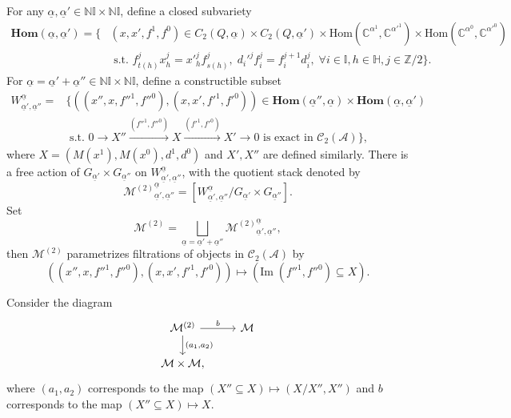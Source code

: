 \documentclass[12pt]{amsart}
\theoremstyle{definition}
\numberwithin{equation}{section}
\begin{document}
For any $ \underline{\alpha},\underline{\alpha}' \in \mathbb{N}\mathbb{I} \times \mathbb{N}\mathbb{I}$, define a closed subvariety
\begin{align*}
    \mathbf{Hom}(\underline{\alpha},\underline{\alpha}') =\{&(x,x',f^1,f^0)  \in C_2(Q,\underline{\alpha}) \times C_2(Q, \underline{\alpha}') \times \mathrm{Hom}(\mathbb{C}^{\alpha^1},\mathbb{C}^{{\alpha}'^{1}}) \times \mathrm{Hom}(\mathbb{C}^{\alpha^0},\mathbb{C}^{{\alpha}'^{0}})\\
    &\text{ s.t. } f_{t(h)}^j x_h^j = {x'}_h^j f_{s(h)}^j, \;d_i'^j f_i^j = f_i^{j+1} d_i^j  ,\; \forall i \in \mathbb{I}, h\in \mathbb{H}, j\in \mathbb{Z}/2\}.
\end{align*} 
For $ \underline{\alpha}=\underline{\alpha}' +\underline{\alpha}'' \in \mathbb{N}\mathbb{I} \times \mathbb{N}\mathbb{I}$, define a constructible subset
\begin{align*}   W_{\underline{\alpha}',\underline{\alpha}''}^{\underline{\alpha}} = &\{((x'',x,f''^1,f''^0), (x,x',f'^1,f'^0)) \in \mathbf{Hom}(\underline{\alpha}'',\underline{\alpha}) \times \mathbf{Hom}(\underline{\alpha},\underline{\alpha}')\\
    &\text{ s.t. } 0 \to X'' \xrightarrow{(f''^1,f''^0)} X \xrightarrow{(f'^1,f'^0)} X' \to 0 \text{ is exact in } \mathcal{C}_2(\mathcal{A})\},
\end{align*}
where $ X= (M(x^1), M(x^0), d^1, d^0)$ and $ X',X'' $ are defined similarly. 
There is a free action of $ G_{\underline{\alpha}'} \times G_{\underline{\alpha}''}$ on $ W_{\underline{\alpha}',\underline{\alpha}''}^{\underline{\alpha}}  $, with the quotient stack denoted by
\[
{\mathcal{M}^{(2)}}_{\underline{\alpha}',\underline{\alpha}''}^{\underline{\alpha}} = [W_{\underline{\alpha}',\underline{\alpha}''}^{\underline{\alpha}}/G_{\underline{\alpha}'} \times G_{\underline{\alpha}''}].
\]
Set
\[
\mathcal{M}^{(2)} =\bigsqcup _{\underline{\alpha}=\underline{\alpha}' +\underline{\alpha}''}{\mathcal{M}^{(2)}}_{\underline{\alpha}',\underline{\alpha}''}^{\underline{\alpha}},
\]
then $ \mathcal{M}^{(2)} $ parametrizes filtrations of objects in $ \mathcal{C}_2(\mathcal{A}) $ by
\[
((x'',x,f''^1,f''^0), (x,x',f'^1,f'^0)) \mapsto (\mathrm{Im}\;(f''^1,f''^0) \subseteq X).
\]

Consider the diagram
\[
\begin{tikzcd}
\mathcal{M}^{(2)} \arrow[r,"b"] \arrow[d,"{(a_1,a_2)}"] & \mathcal{M} \\
\mathcal{M} \times \mathcal{M},
\end{tikzcd}
\]
where $ (a_1,a_2) $ corresponds to the map $ (X'' \subseteq X) \mapsto (X/X'',X'') $ and $ b $ corresponds to the map $ (X'' \subseteq X) \mapsto X $.
\end{document}
